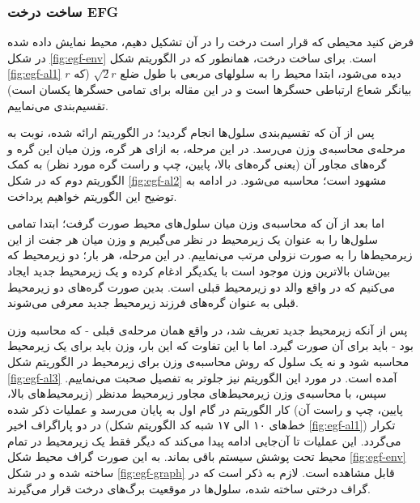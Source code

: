 \subsubsection{ساخت درخت EFG}
فرض کنید محیطی که قرار است درخت را در آن تشکیل دهیم، محیط نمایش داده شده در شکل \ref{fig:egf-env} است. برای ساخت درخت، همانطور که در الگوریتم شکل \ref{fig:egf-al1} دیده می‌شود، ابتدا محیط را به سلولهای مربعی با طول ضلع $\sqrt{2}r$ (که $r$ بیانگر شعاع ارتباطی حسگرها است و در این مقاله برای تمامی حسگرها یکسان است) تقسیم‌بندی می‌نماییم.
\par
پس از آن که تقسیم‌بندی سلول‌ها انجام گردید؛ در الگوریتم ارائه شده، نوبت به مرحله‌ی محاسبه‌ی وزن می‌رسد. در این مرحله، به ازای هر گره، وزن میان این گره و گره‌های مجاور آن (یعنی گره‌های بالا، پایین، چپ و راست گره مورد نظر) به کمک الگوریتم دوم که در شکل \ref{fig:egf-al2} مشهود است؛‌ محاسبه می‌شود. در ادامه به توضیح این الگوریتم خواهیم پرداخت.
\par
اما بعد از آن که محاسبه‌ی وزن میان سلول‌های محیط صورت گرفت؛ ابتدا تمامی سلول‌ها را به عنوان یک زیرمحیط در نظر می‌گیریم و وزن میان هر جفت از این زیرمحیط‌ها را به صورت نزولی مرتب می‌نماییم. در این مرحله، هر بار؛ دو زیرمحیط که بین‌شان بالاترین وزن موجود است با یکدیگر ادغام کرده و یک زیرمحیط جدید ایجاد می‌کنیم که در واقع والد دو زیرمحیط قبلی است. بدین صورت گره‌های دو زیرمحیط قبلی به عنوان گره‌های فرزند زیرمحیط جدید معرفی می‌شوند.
\par
پس از آنکه زیرمحیط جدید تعریف شد، در واقع همان مرحله‌ی قبلی - که محاسبه وزن بود - باید برای آن صورت گیرد. اما با این تفاوت که این بار، وزن باید برای یک زیرمحیط محاسبه شود و نه یک سلول که روش محاسبه‌ی وزن برای زیرمحیط در الگوریتم شکل \ref{fig:egf-al3} آمده است. در مورد این الگوریتم نیز جلوتر به تفصیل صحبت می‌نماییم. سپس، با محاسبه‌ی وزن زیرمحیط‌های مجاور زیرمحیط مدنظر (زیرمحیط‌های بالا، پایین، چپ و راست آن) کار الگوریتم در گام اول به پایان می‌رسد و عملیات ذکر شده در دو پاراگراف اخیر (خط‌های ۱۰ الی ۱۷ شبه کد الگوریتم شکل \ref{fig:egf-al1}) تکرار می‌گردد. این عملیات تا آن‌جایی ادامه پیدا ‌می‌کند که دیگر فقط یک زیرمحیط در تمام محیط تحت پوشش سیستم باقی بماند.
به این صورت گراف محیط شکل \ref{fig:egf-env} ساخته شده و در شکل \ref{fig:egf-graph} قابل مشاهده است. لازم به ذکر است که در گراف درختی ساخته شده، سلول‌ها در موقعیت برگ‌های درخت قرار می‌گیرند.

